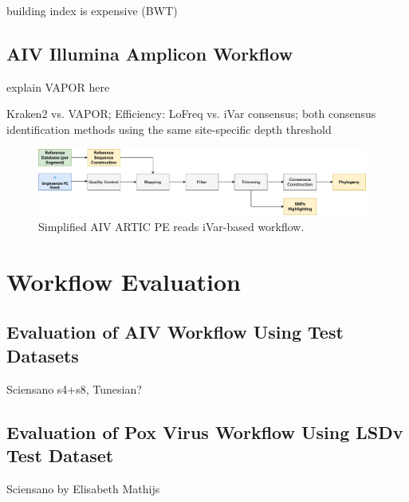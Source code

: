 building index is expensive (BWT)

\subsection{AIV Illumina Amplicon Workflow}

explain VAPOR here

Kraken2 vs. VAPOR;
Efficiency: LoFreq vs. iVar consensus; both consensus identification methods using the same site-specific depth threshold

\begin{figure}
	\centering
	\includegraphics[width=0.97\textwidth]{media/3-pipelines-AIV.pdf}
	\caption{Simplified AIV ARTIC PE reads iVar-based workflow.}
	\label{fig:3-pipelines-aiv}
\end{figure}

\section{Workflow Evaluation}
\subsection{Evaluation of AIV Workflow Using Test Datasets}
 Sciensano s4+s8, Tunesian?

\subsection{Evaluation of Pox Virus Workflow Using LSDv Test Dataset}
 Sciensano by Elisabeth Mathijs
